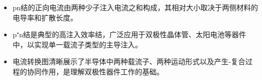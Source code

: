 \begin{insightbox}[物理图像]
\begin{itemize}
    \item pn结的正向电流由两种少子注入电流之和构成，其相对大小取决于两侧材料的电导率和扩散长度。
    \item p⁺n结是典型的高注入效率结，广泛应用于双极性晶体管、太阳电池等器件中，以实现单一载流子类型的主导注入。
    \item 电流转换图清晰展示了半导体中两种载流子、两种运动形式以及产生-复合过程的协同作用，是理解双极性器件工作的基础。
\end{itemize}
\end{insightbox}
